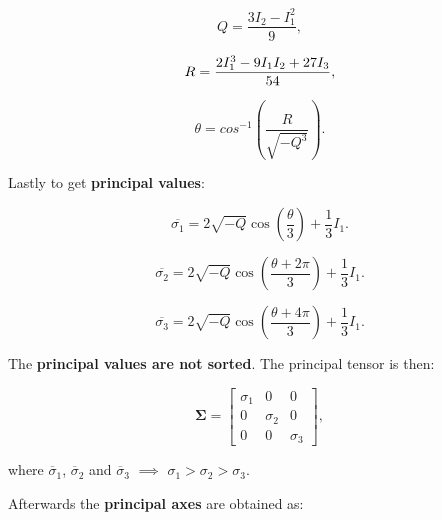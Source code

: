 \begin{itemize}
        \begin{equation}
            Q = \frac{3 I_{2} - I_{1}^{2}}{9}
        ,\end{equation}

        \begin{equation}
            R = \frac{2 I_{1}^{3} - 9 I_{1} I_{2} + 27 I_{3}}{54} \\
        ,\end{equation}

        \begin{equation}
            \theta = cos^{-1} \left( \frac{ R }{ \sqrt{- Q^{3}}} \right)
        .\end{equation}

        Lastly to get \textbf{principal values}:

        \begin{equation}
            \overline{\sigma_{1}}
            = 2 \sqrt{-Q} \cos{\left(\frac{\theta}{3}\right)} + \frac{1}{3}I_{1}
        .\end{equation}

        \begin{equation}
            \overline{\sigma_{2}}
            = 2 \sqrt{-Q} \cos{\left(\frac{\theta + 2 \pi}{3}\right)} + \frac{1}{3}I_{1}
        .\end{equation}

        \begin{equation}
            \overline{\sigma_{3}}
            = 2 \sqrt{-Q} \cos{\left(\frac{\theta + 4 \pi}{3}\right)} + \frac{1}{3}I_{1}
        .\end{equation}

        The \textbf{principal values are not sorted}. The principal tensor is then:

        \begin{equation}
            \mathbf{\Sigma} = \begin{bmatrix}
                \sigma_{1} & 0 & 0 \\
                0 & \sigma_{2}  & 0 \\
                0 & 0 & \sigma_{3}
            \end{bmatrix}
        ,\end{equation}

        where $\overline{\sigma}_{1}$, $\overline{\sigma}_{2}$ and $\overline{\sigma}_{3}$
        $\implies$ $\sigma_1 > \sigma_2 > \sigma_3$.

        Afterwards the \textbf{principal axes} are obtained as:


\end{itemize}
